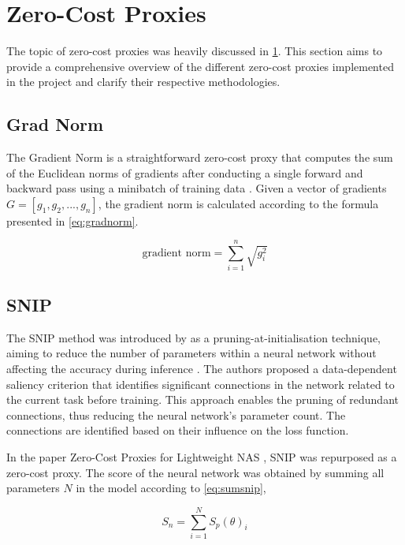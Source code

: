 \section{Zero-Cost Proxies}\label{zcproxies}

The topic of zero-cost proxies was heavily discussed in \cref{zcproxies}. This section aims to provide a comprehensive overview of the different zero-cost proxies implemented in the project and clarify their respective methodologies.

\subsection{Grad Norm}
The Gradient Norm is a straightforward zero-cost proxy that computes the sum of the Euclidean norms of gradients after conducting a single forward and backward pass using a minibatch of training data \autocite{abdelfattah2021zero}. Given a vector of gradients \(G = [g_1, g_2, ..., g_n]\), the gradient norm is calculated according to the formula presented in \cref{eq:gradnorm}.

\begin{equation}\label{eq:gradnorm}
\text{gradient norm} = \sum_{i=1}^n \sqrt{g_i^2}
\end{equation}

\subsection{SNIP}
The \gls{SNIP} method was introduced by \autocite{lee2018snip} as a pruning-at-initialisation technique, aiming to reduce the number of parameters within a neural network without affecting the accuracy during inference \autocite{frankle2020pruning}. The authors proposed a data-dependent saliency criterion that identifies significant connections in the network related to the current task before training. This approach enables the pruning of redundant connections, thus reducing the neural network's parameter count. The connections are identified based on their influence on the loss function.

\noindent In the paper Zero-Cost Proxies for Lightweight \gls{NAS} \autocite{abdelfattah2021zero}, \gls{SNIP} was repurposed as a zero-cost proxy. The score of the neural network was obtained by summing all parameters $N$ in the model according to \cref{eq:sumsnip},

\begin{equation}\label{eq:sumsnip}
S_n = \sum_{i=1}^N S_p(\theta)_i
\end{equation}

